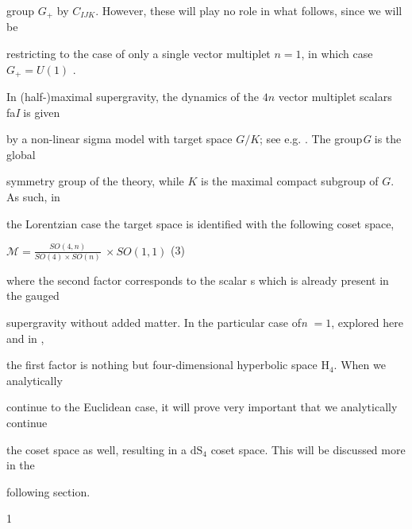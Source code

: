 \documentclass[a4paper,12pt]{article}
\begin{document}
group $G_{+}$ by $C_{IJK}$. However, these will play no role in what follows, since we will be

restricting to the case of only a single vector multiplet $n = 1$, in which case $G_{+} = U(1)$ .

In (half-)maximal supergravity, the dynamics of the $4n$ vector multiplet scalars fa{\it I} is given

by a non-linear sigma model with target space $G/K$; see e.g. . The group{\it G} is the global

symmetry group of the theory, while $K$ is the maximal compact subgroup of $G$. As such, in

the Lorentzian case the target space is identified with the following coset space,
\begin{center}
$\displaystyle \mathcal{M}=\frac{SO(4,n)}{SO(4)\times SO(n)}\ \times SO(1,1)$   (3)
\end{center}
where the second factor corresponds to the scalar s which is already present in the gauged

supergravity without added matter. In the particular case of{\it n} $= 1$, explored here and in ,

the first factor is nothing but four-dimensional hyperbolic space $\mathrm{H}_{4}$. When we analytically

continue to the Euclidean case, it will prove very important that we analytically continue

the coset space as well, resulting in a $\mathrm{d}\mathrm{S}_{4}$ coset space. This will be discussed more in the

following section.

1
\end{document}
